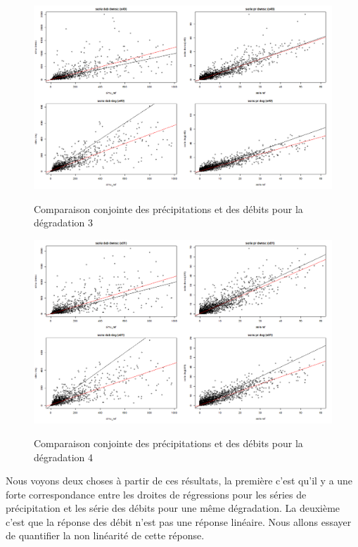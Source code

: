 \documentclass[a4paper,11pt]{article}
\numberwithin{equation}{section}
\begin{document}
\begin{figure}[H]
	\begin{center}
		\includegraphics[scale=0.35]{images/multi_comparaison_4.png}\\
	\end{center}
\caption{Comparaison conjointe des précipitations et des débits pour la dégradation 3}
\end{figure} 
\begin{figure}[H]
	\begin{center}
		\includegraphics[scale=0.35]{images/multi_comparaison_5.png}\\
	\end{center}
	\caption{Comparaison conjointe des précipitations et des débits pour la dégradation 4}
\end{figure} 

Nous voyons deux choses à partir de ces résultats, la première c'est qu'il y a une forte correspondance entre les droites de régressions pour les séries de précipitation et les série des débits pour une même dégradation. La deuxième c'est que la réponse des débit n'est pas une réponse linéaire. Nous allons essayer de quantifier la non linéarité de cette réponse.
 
\end{document}
